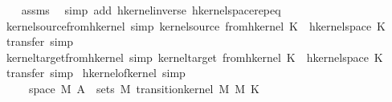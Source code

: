 \begin{isabellebody}
%
\isadelimproof
\ \ %
\endisadelimproof
%
\isatagproof
{}\isamarkupfalse%
\ assms\ \isamarkupfalse%
\ {\isacharparenleft}{\kern0pt}simp\ add{\isacharcolon}{\kern0pt}\ hkernel{\isacharunderscore}{\kern0pt}inverse\ hkernel{\isacharunderscore}{\kern0pt}space{\isachardot}{\kern0pt}rep{\isacharunderscore}{\kern0pt}eq{\isacharparenright}{\kern0pt}%
\endisatagproof
{\isafoldproof}%
%
\isadelimproof
\isanewline
%
\endisadelimproof
\isanewline
{}\isamarkupfalse%
\ kernel{\isacharunderscore}{\kern0pt}source{\isacharunderscore}{\kern0pt}from{\isacharunderscore}{\kern0pt}hkernel\ {\isacharbrackleft}{\kern0pt}simp{\isacharbrackright}{\kern0pt}{\isacharcolon}{\kern0pt}\ {\isachardoublequoteopen}kernel{\isacharunderscore}{\kern0pt}source\ {\isacharparenleft}{\kern0pt}from{\isacharunderscore}{\kern0pt}hkernel\ K{\isacharparenright}{\kern0pt}\ {\isacharequal}{\kern0pt}\ hkernel{\isacharunderscore}{\kern0pt}space\ K{\isachardoublequoteclose}\isanewline
%
\isadelimproof
\ \ %
\endisadelimproof
%
\isatagproof
{}\isamarkupfalse%
\ {\isacharparenleft}{\kern0pt}transfer{\isacharcomma}{\kern0pt}\ simp{\isacharparenright}{\kern0pt}%
\endisatagproof
{\isafoldproof}%
%
\isadelimproof
\isanewline
%
\endisadelimproof
\isanewline
{}\isamarkupfalse%
\ kernel{\isacharunderscore}{\kern0pt}target{\isacharunderscore}{\kern0pt}from{\isacharunderscore}{\kern0pt}hkernel\ {\isacharbrackleft}{\kern0pt}simp{\isacharbrackright}{\kern0pt}{\isacharcolon}{\kern0pt}\ {\isachardoublequoteopen}kernel{\isacharunderscore}{\kern0pt}target\ {\isacharparenleft}{\kern0pt}from{\isacharunderscore}{\kern0pt}hkernel\ K{\isacharparenright}{\kern0pt}\ {\isacharequal}{\kern0pt}\ hkernel{\isacharunderscore}{\kern0pt}space\ K{\isachardoublequoteclose}\isanewline
%
\isadelimproof
\ \ %
\endisadelimproof
%
\isatagproof
{}\isamarkupfalse%
\ {\isacharparenleft}{\kern0pt}transfer{\isacharcomma}{\kern0pt}\ simp{\isacharparenright}{\kern0pt}%
\endisatagproof
{\isafoldproof}%
%
\isadelimproof
\isanewline
%
\endisadelimproof
\isanewline
{}\isamarkupfalse%
\ hkernel{\isacharunderscore}{\kern0pt}of{\isacharunderscore}{\kern0pt}kernel\ {\isacharbrackleft}{\kern0pt}simp{\isacharbrackright}{\kern0pt}{\isacharcolon}{\kern0pt}\isanewline
\ \ \ {\isachardoublequoteopen}{\isasymomega}\ {\isasymin}\ space\ M{\isachardoublequoteclose}\ {\isachardoublequoteopen}A{\isacharprime}{\kern0pt}\ {\isasymin}\ sets\ M{\isachardoublequoteclose}\ {\isachardoublequoteopen}transition{\isacharunderscore}{\kern0pt}kernel\ M\ M\ K{\isachardoublequoteclose}\isanewline

\end{isabellebody}
